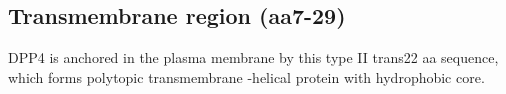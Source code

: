 \subsection{Transmembrane region (aa7-29)}

DPP4 is anchored in the plasma membrane by this type II trans22 aa sequence, which forms polytopic transmembrane \alpha-helical protein with hydrophobic core.~\cite{Hong_1990}